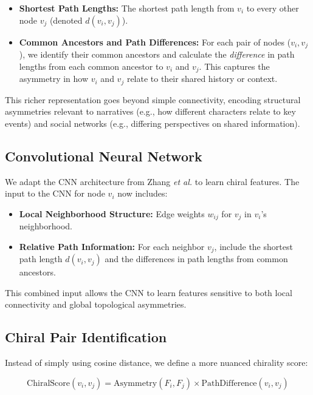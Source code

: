 \documentclass[12pt, a4paper]{article}
\begin{document}
\begin{itemize}
    \item \textbf{Shortest Path Lengths:} The shortest path length from $v_i$ to every other node $v_j$ (denoted $d(v_i, v_j)$).
    \item \textbf{Common Ancestors and Path Differences:} For each pair of nodes ($v_i, v_j$), we identify their common ancestors and calculate the \textit{difference} in path lengths from each common ancestor to $v_i$ and $v_j$. This captures the asymmetry in how $v_i$ and $v_j$ relate to their shared history or context.
\end{itemize}

This richer representation goes beyond simple connectivity, encoding structural asymmetries relevant to narratives (e.g., how different characters relate to key events) and social networks (e.g., differing perspectives on shared information).

\subsection{Convolutional Neural Network}

We adapt the CNN architecture from Zhang \textit{et al.} \cite{zhang2018machine} to learn chiral features. The input to the CNN for node $v_i$ now includes:

\begin{itemize}
    \item \textbf{Local Neighborhood Structure:} Edge weights $w_{ij}$ for $v_j$ in $v_i$'s neighborhood.
    \item \textbf{Relative Path Information:} For each neighbor $v_j$, include the shortest path length $d(v_i, v_j)$ and the differences in path lengths from common ancestors.
\end{itemize}

This combined input allows the CNN to learn features sensitive to both local connectivity and global topological asymmetries.

\subsection{Chiral Pair Identification}

Instead of simply using cosine distance, we define a more nuanced chirality score:

\begin{equation}
\text{ChiralScore}(v_i, v_j) = \text{Asymmetry}(F_i, F_j) \times \text{PathDifference}(v_i, v_j)
\end{equation}
\end{document}
